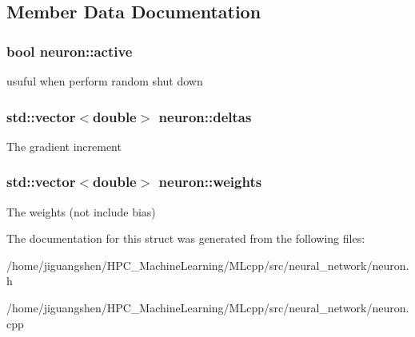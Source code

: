 \subsection{Member Data Documentation}
\hypertarget{structneuron_a23ae47a4501a58d5f9ac6b5d37622e9a}{
\subsubsection[{active}]{\setlength{\rightskip}{0pt plus 5cm}bool neuron\-::active}}\label{structneuron_a23ae47a4501a58d5f9ac6b5d37622e9a}
usuful when perform random shut down \hypertarget{structneuron_adbb698db478b03d1df7da41d977a8690}{
\subsubsection[{deltas}]{\setlength{\rightskip}{0pt plus 5cm}std\-::vector$<$double$>$ neuron\-::deltas}}\label{structneuron_adbb698db478b03d1df7da41d977a8690}
The gradient increment \hypertarget{structneuron_a46dd6f29c430390f623f708e12fdf333}{
\subsubsection[{weights}]{\setlength{\rightskip}{0pt plus 5cm}std\-::vector$<$double$>$ neuron\-::weights}}\label{structneuron_a46dd6f29c430390f623f708e12fdf333}
The weights (not include bias) 

The documentation for this struct was generated from the following files\-:\begin{DoxyCompactItemize}
\item 
/home/jiguangshen/\-H\-P\-C\-\_\-\-Machine\-Learning/\-M\-Lcpp/src/neural\-\_\-network/neuron.\-h\item 
/home/jiguangshen/\-H\-P\-C\-\_\-\-Machine\-Learning/\-M\-Lcpp/src/neural\-\_\-network/neuron.\-cpp\end{DoxyCompactItemize}
